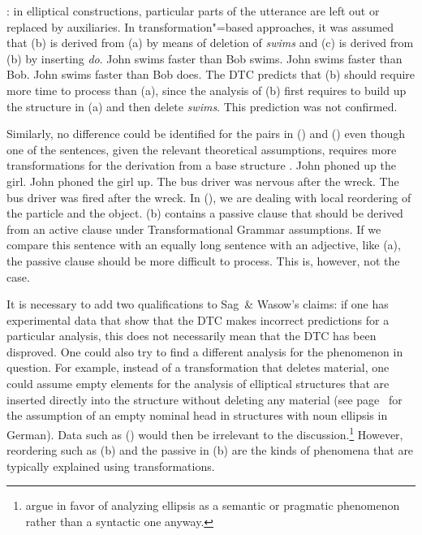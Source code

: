 \citep*[]{FBG74a-u}: in elliptical constructions, particular parts of the utterance are left out or replaced by auxiliaries.
In transformation"=based approaches, it was assumed that (b) is derived from (a) by means of deletion of
\emph{swims} and (c) is derived from (b) by inserting \emph{do}.
\eal
\ex John swims faster than Bob swims.
\ex John swims faster than Bob.
\ex John swims faster than Bob does.
\zl
The DTC predicts that (b) should require more time to process than (a),
since the analysis of (b) first requires to build up the structure in (a) and then delete \emph{swims}. This prediction was not confirmed.

Similarly, no difference could be identified for the pairs in () and () even though one of the sentences, given the relevant theoretical
assumptions, requires more
transformations for the derivation from a base structure \citep*[]{FBG74a-u}.
\eal
\ex John phoned up the girl.
\ex John phoned the girl up.
\zl
\eal
\ex The bus driver was nervous after the wreck.
\ex The bus driver was fired after the wreck.
\zl
In (), we are dealing with local reordering of the particle and the object. (b) contains a passive clause that
should be derived from an active clause under Transformational Grammar assumptions. If we compare this sentence with an equally long sentence
with an adjective, like (a), the passive clause should be more difficult to process. This is, however, not the case.

It is necessary to add two qualifications to Sag~\& Wasow's claims: if one has experimental data that show that the DTC makes incorrect predictions for a particular
analysis, this does not necessarily mean that the DTC has been disproved. One could also try to find a different analysis for the phenomenon in question.
For example, instead of a transformation that deletes material, one could assume empty elements for the analysis of elliptical structures that are inserted
directly into the structure without deleting any material (see page~\pageref{np-epsilon} for the
assumption of an empty nominal head in structures with noun ellipsis in German). Data such as () would then be irrelevant to the discussion.\footnote{
  \citet[Chapters~1 and ~7]{CJ2005a} argue in favor of analyzing ellipsis as a semantic or pragmatic phenomenon rather than a syntactic
  one anyway.
} 
However, reordering such as (b) and the passive in (b) are the kinds of phenomena that are typically explained using transformations.

